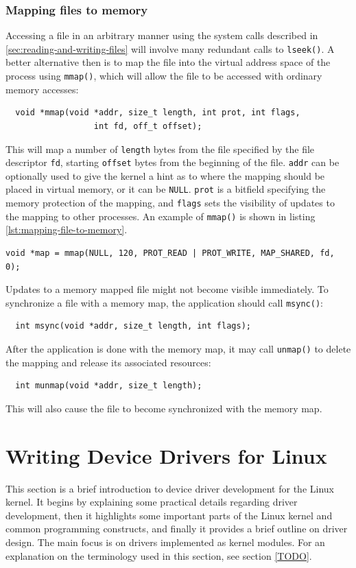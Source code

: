 \subsubsection{Mapping files to memory}\label{mapping-files-to-memory}
Accessing a file in an arbitrary manner using the system calls described in \ref{sec:reading-and-writing-files} will involve many redundant calls to \texttt{lseek()}. A better alternative then is to map the file into the virtual address space of the process using \texttt{mmap()}, which will allow the file to be accessed with ordinary memory accesses:
\begin{verbatim}
  void *mmap(void *addr, size_t length, int prot, int flags,
                  int fd, off_t offset);
\end{verbatim}
This will map a number of \texttt{length} bytes from the file specified by the file descriptor \texttt{fd}, starting 
\texttt{offset} bytes from the beginning of the file. \texttt{addr} can be optionally used to give the kernel a hint as to where the mapping should be placed in virtual memory, or it can be \texttt{NULL}. \texttt{prot} is a bitfield specifying the memory protection of the mapping, and \texttt{flags} sets the visibility of updates to the mapping to other processes. An example of \texttt{mmap()} is shown in listing \ref{lst:mapping-file-to-memory}.
\lstset{style=lststyle-c}
\begin{lstlisting}[caption=Mapping the first 120 bytes of a file to memory,label=lst:mapping-file-to-memory]
void *map = mmap(NULL, 120, PROT_READ | PROT_WRITE, MAP_SHARED, fd, 0);
\end{lstlisting}

Updates to a memory mapped file might not become visible immediately. To synchronize a file with a memory map, the application should call \texttt{msync()}:
\begin{verbatim}
  int msync(void *addr, size_t length, int flags);
\end{verbatim}

After the application is done with the memory map, it may call \texttt{unmap()} to delete the mapping and release its associated resources: 
\begin{verbatim}
  int munmap(void *addr, size_t length);
\end{verbatim}
This will also cause the file to become synchronized with the memory map.



\section{Writing Device Drivers for Linux}\label{writing-device-drivers-for-linux}
This section is a brief introduction to device driver development for the Linux kernel. It begins by explaining some practical details regarding driver development, then it highlights some important parts of the Linux kernel and common programming constructs, and finally it provides a brief outline on driver design. The main focus is on drivers implemented as kernel modules. For an explanation on the terminology used in this section, see section \ref{TODO}.


